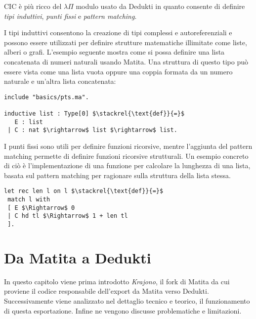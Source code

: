\documentclass[12pt,a4paper]{mimosis}
\begin{document}
\begin{prooftree}
\end{prooftree}

\begin{prooftree}
\end{prooftree}


CIC è più ricco del $\lambda\Pi$ modulo usato da Dedukti in quanto consente di definire 
\textit{tipi induttivi}, \textit{punti fissi} e \textit{pattern matching}.


I tipi induttivi consentono la creazione di tipi complessi e autoreferenziali e possono
essere utilizzati per definire strutture matematiche illimitate come liste,
alberi o grafi. L'esempio seguente mostra come si possa definire una lista concatenata
di numeri naturali usando Matita. Una struttura di questo tipo può essere vista come
una lista vuota oppure una coppia formata da un numero naturale e un'altra lista 
concatenata:

\begin{lstlisting}[mathescape]
include "basics/pts.ma".

inductive list : Type[0] $\stackrel{\text{def}}{=}$
   E : list
 | C : nat $\rightarrow$ list $\rightarrow$ list.

\end{lstlisting}

I punti fissi sono utili per definire funzioni ricorsive, mentre l'aggiunta del
pattern matching permette di definire funzioni ricorsive strutturali. Un esempio
concreto di ciò è l'implementazione di una funzione per calcolare la lunghezza
di una lista, basata sul pattern matching per ragionare sulla struttura della 
lista stessa.

\begin{lstlisting}
let rec len l on l $\stackrel{\text{def}}{=}$
 match l with
 [ E $\Rightarrow$ 0
 | C hd tl $\Rightarrow$ 1 + len tl
 ].
\end{lstlisting}


\chapter{Da Matita a Dedukti} \label{capitoloExport}
In questo capitolo viene prima introdotto \textit{Krajono}, il fork di Matita
da cui proviene il codice responsabile dell'export da Matita verso Dedukti. 
Successivamente viene analizzato nel dettaglio tecnico e teorico, il funzionamento 
di questa esportazione. Infine ne vengono discusse problematiche e limitazioni.
\end{document}
